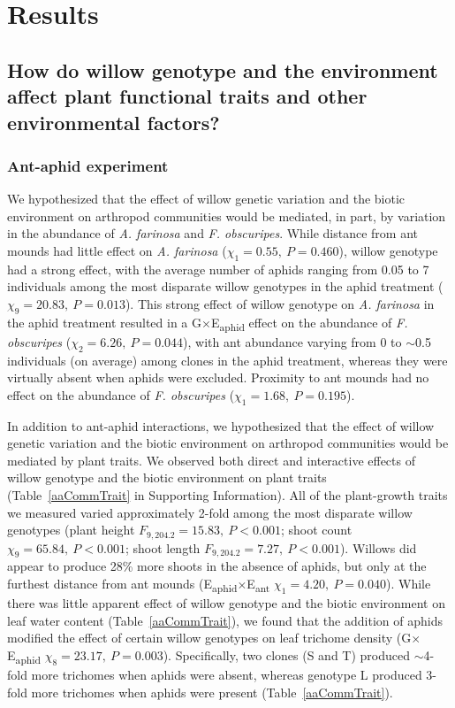 \documentclass[11pt]{article}
\begin{document}
\section*{Results}

\subsection*{How do willow genotype and the environment affect plant functional traits and other environmental factors?}

\subsubsection*{Ant-aphid experiment}

We hypothesized that the effect of willow genetic variation and the
biotic environment on arthropod communities would be mediated, in part,
by variation in the abundance of \textit{A. farinosa} and \textit{F.
obscuripes}. While distance from ant mounds had little effect on \textit{A.
farinosa} (\(\chi_1=0.55,\ P=0.460\)), willow genotype had a strong effect, with
the average number of aphids ranging from 0.05 to 7 individuals among the most
disparate willow genotypes in the aphid treatment (\(\chi_9=20.83,\ P=0.013\)).
This strong effect of willow genotype on \textit{A. farinosa} in the aphid
treatment resulted in a G$\times$E\textsubscript{aphid} effect on the abundance
of \textit{F. obscuripes} ($\chi_2=6.26, \ P=0.044$), with ant abundance varying
from 0 to $\sim$0.5 individuals (on average) among clones in
the aphid treatment, whereas they were virtually absent when aphids were excluded. Proximity to ant mounds had no effect on the abundance of
\textit{F. obscuripes} (\(\chi_1=1.68,\ P=0.195\)).

In addition to ant-aphid interactions, we hypothesized that the effect
of willow genetic variation and the biotic environment on arthropod
communities would be mediated by plant traits. We observed both direct
and interactive effects of willow genotype and the biotic environment on
plant traits (Table~\ref{aaCommTrait} in Supporting Information). All of the plant-growth traits we measured
varied approximately 2-fold among the most disparate willow genotypes
(plant height \(F_{9,204.2}=15.83,\ P<0.001\); shoot count \(\chi_9=65.84,\ P<0.001\); shoot
length \(F_{9,204.2}=7.27,\ P<0.001\)). Willows did appear to produce 28\% more
shoots in the absence of aphids, but only at the furthest distance from
ant mounds (E\textsubscript{aphid}$\times$E\textsubscript{ant} $\chi_1=4.20,\ P=0.040$). While there was little apparent effect
of willow genotype and the biotic environment on leaf water content
(Table~\ref{aaCommTrait}), we found that the addition of aphids modified the effect of
certain willow genotypes on leaf trichome density (G$\times$E\textsubscript{aphid} $\chi_8=23.17,\ P=0.003$).
Specifically, two clones (S and T) produced $\sim$4-fold more
trichomes when aphids were absent, whereas genotype L produced 3-fold
more trichomes when aphids were present (Table~\ref{aaCommTrait}).
\end{document}
